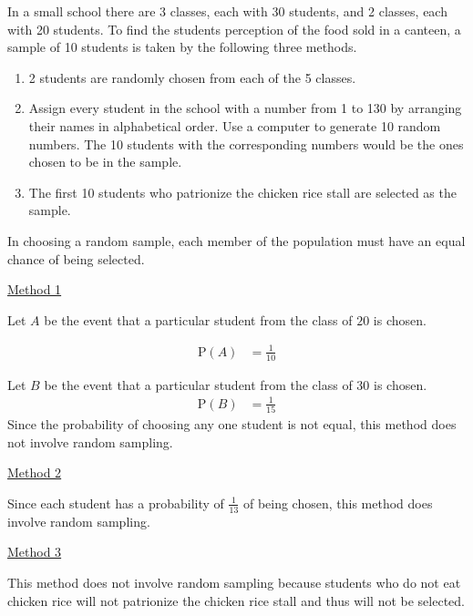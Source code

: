 \documentclass[11pt,a4paper]{book}
\begin{document}
\begin{example}

In a small school there are 3 classes, each with 30 students, and
2 classes, each with 20 students. To find the students perception
of the food sold in a canteen, a sample of 10 students is taken by
the following three methods.

\begin{enumerate}[label=Method \arabic*:, leftmargin=2cm]

\item  2 students are randomly chosen from each of the 5 classes.

\item  Assign every student in the school with a number from 1 to
130 by arranging their names in alphabetical order. Use a computer
to generate 10 random numbers. The 10 students with the corresponding
numbers would be the ones chosen to be in the sample.

\item  The first 10 students who patrionize the chicken rice stall
are selected as the sample.

\end{enumerate}

\Solution

In choosing a random sample, each member of the population must have an equal chance of being selected.

\uline{Method 1}

Let $A$ be the event that a particular student from the class of
$20$ is chosen.

\begin{align*}
\text{P}\left(A\right) & =\frac{1}{10}
\end{align*}

Let $B$ be the event that a particular student from the class of
$30$ is chosen.
\begin{align*}
\text{P}\left(B\right) & =\frac{1}{15}
\end{align*}
Since the probability of choosing any one student is not equal, this
method does not involve random sampling.

\uline{Method 2}

Since each student has a probability of ${\displaystyle \frac{1}{13}}$
of being chosen, this method does involve random sampling.

\uline{Method 3}

This method does not involve random sampling because students who
do not eat chicken rice will not patrionize the chicken rice stall
and thus will not be selected.

\end{example}
\end{document}
